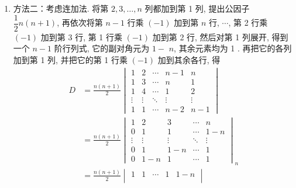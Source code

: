 \begin{exercise}
\begin{exgroup}
\begin{answer}
\begin{enumerate}
\begin{enumerate}
                          \item 方法二：考虑连加法. 将第 $2,3, \ldots, n$ 列都加到第 1 列, 提出公因子 $\dfrac{1}{2} n(n+1)$, 再依次将第 $n-1$ 行乘 $(-1)$ 加到第 $n$ 行, $\cdots$, 第 2 行乘 $(-1)$ 加到第 3 行, 第 1 行乘 $(-1)$ 加到第 2 行, 然后对第 1 列展开, 得到一个 $n-1$ 阶行列式, 它的副对角元为 $1-$ $n$, 其余元素均为 1 . 再把它的各列加到第 1 列, 并把它的第 1 行乘 $(-1)$ 加到其余各行, 得
                                \begin{align*}
                                    D & =\frac{n(n+1)}{2}\begin{vmatrix}
                                                             1      & 2      & \cdots & n-1    & n      \\
                                                             1      & 3      & \cdots & n      & 1      \\
                                                             1      & 4      & \cdots & 1      & 2      \\
                                                             \vdots & \vdots & \ddots & \vdots & \vdots \\
                                                             1      & 1      & \cdots & n-2    & n-1
                                                         \end{vmatrix} \\
                                      & =\frac{n(n+1)}{2}\begin{vmatrix}
                                                             1      & 2      & 3      & \cdots & n      \\
                                                             0      & 1      & 1      & \cdots & 1-n    \\
                                                             \vdots & \vdots & \vdots & \ddots & \vdots \\
                                                             0      & 1      & 1-n    & \cdots & 1      \\
                                                             0      & 1-n    & 1      & \cdots & 1
                                                         \end{vmatrix}_{n} \\
                                      & =\frac{n(n+1)}{2}
                                    \begin{vmatrix}
                                        1      & 1      & \cdots & 1      & 1-n \\

\end{vmatrix}
\end{align*}
\end{enumerate}
\end{enumerate}
\end{answer}
\end{exgroup}
\end{exercise}
